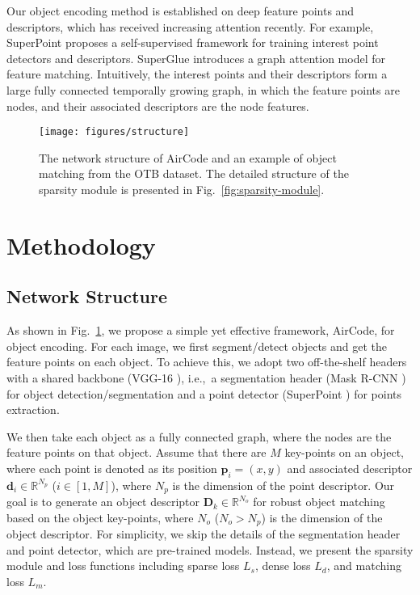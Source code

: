 \documentclass[letterpaper, 10 pt, journal, twoside]{IEEEtran}  %
\newcommand{\fref}[1]{Fig.~\ref{#1}}
\newcommand{\fix}[1]{#1}
\newcommand{\ie}{{i.e.},~}
\begin{document}
Our object encoding method is established on deep feature points and descriptors, which has received increasing attention recently.
For example, SuperPoint \cite{detone2018superpoint} proposes a self-supervised framework for training interest point detectors and descriptors. SuperGlue \cite{sarlin2020superglue} introduces a graph attention model for feature matching. Intuitively, the interest points and their descriptors form a large \fix{fully connected} temporally growing graph, in which the feature points are nodes, and their associated descriptors are the node features.

\begin{figure}[t]
    \centering
    \texttt{[image: figures/structure]}
    \caption{The network structure of AirCode and an example of object matching from the OTB dataset. The detailed structure of the sparsity module is presented in \fref{fig:sparsity-module}.}
    \label{fig:structure}
\end{figure}

\section{Methodology}


\fix{

\subsection{Network Structure}

As shown in \fref{fig:structure}, we propose a simple yet effective framework, AirCode, for object encoding.
For each image, we first segment/detect objects and get the feature points on each object.
To achieve this, we adopt two off-the-shelf headers with a shared backbone (VGG-16 \cite{simonyan2014very}), \ie a segmentation header (Mask R-CNN \cite{he2017mask}) for object detection/segmentation and a point detector (SuperPoint \cite{detone2018superpoint}) for points extraction.

We then take each object as a fully connected graph, where the nodes are the feature points on that object.
Assume that there are $M$ key-points on an object, where each point is denoted as its position $\mathbf{p}_i=(x,y)$ and associated descriptor $\mathbf{d}_i\in\mathbb{R}^{N_p}$ ($i\in[1,M]$), where $N_p$ is the dimension of the point descriptor.
Our goal is to generate an object descriptor $\mathbf{D}_k\in\mathbb{R}^{N_o}$ for robust object matching based on the object key-points, where $N_o$ ($N_o>N_p$) is the dimension of the object descriptor.
For simplicity, we skip the details of the segmentation header and point detector, which are pre-trained models.
Instead, we present the sparsity module and loss functions including sparse loss $L_s$, dense loss $L_d$, and matching loss $L_m$.
}
\end{document}
